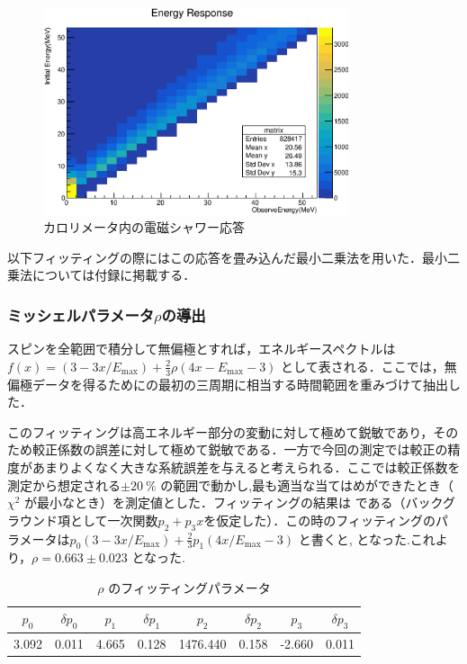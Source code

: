 \begin{figure}[hbt]
\centering
\includegraphics[width=0.8\textwidth]{figure/hatano/response.eps}
\caption{カロリメータ内の電磁シャワー応答}
\label{hatano_fig:response}
\end{figure}

以下フィッティングの際にはこの応答を畳み込んだ最小二乗法を用いた．最小二乗法については付録に掲載する．

\subsubsection{ミッシェルパラメータ$\rho$の導出}
スピンを全範囲で積分して無偏極とすれば，エネルギースペクトルは$f(x)=(3 - 3x / E_\mathrm{max})+\frac{2}{3}\rho(4x - E_\mathrm{max} - 3)$ として表される．ここでは，無偏極データを得るためにの最初の三周期に相当する時間範囲を重みづけて抽出した．

このフィッティングは高エネルギー部分の変動に対して極めて鋭敏であり，そのため較正係数の誤差に対して極めて鋭敏である．一方で今回の測定では較正の精度があまりよくなく大きな系統誤差を与えると考えられる．ここでは較正係数を測定から想定される$\pm 20~\%$ の範囲で動かし,最も適当な当てはめができたとき（$\chi^2$ が最小なとき）を測定値とした．フィッティングの結果は である（バックグラウンド項として一次関数$p_2+p_3x$を仮定した）．この時のフィッティングのパラメータは$p_0(3 - 3x / E_\mathrm{max}) + \frac{2}{3} p_{1} (4x / E_\mathrm{max} - 3)$ と書くと, となった.これより，$\rho=0.663 \pm 0.023$ となった.
\begin{table}[hbt]
\centering
\caption{$\rho$ のフィッティングパラメータ}
\begin{tabular}{cccccccc}
$p_0$ & $\delta p_0$ & $p_1$ & $\delta p_1$ & $p_2$ & $\delta p_2$ & $p_3$ & $\delta p_3$ \\ \hline
3.092 & 0.011 & 4.665 & 0.128 & 1476.440 & 0.158 & -2.660 & 0.011
\end{tabular}
\label{hatano_tab:rho}
\end{table}

